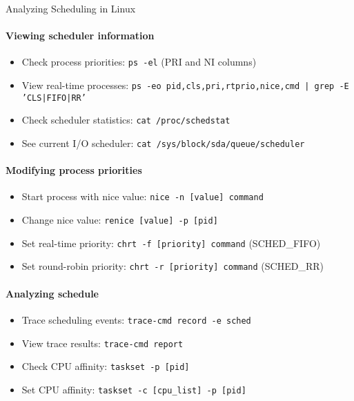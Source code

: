 \begin{KR}{Analyzing Scheduling in Linux}
    \paragraph{Viewing scheduler information}
    \begin{itemize}
        \item Check process priorities: \texttt{ps -el} (PRI and NI columns)
        \item View real-time processes: \texttt{ps -eo pid,cls,pri,rtprio,nice,cmd | grep -E 'CLS|FIFO|RR'}
        \item Check scheduler statistics: \texttt{cat /proc/schedstat}
        \item See current I/O scheduler: \texttt{cat /sys/block/sda/queue/scheduler}
    \end{itemize}
    
    \paragraph{Modifying process priorities}
    \begin{itemize}
        \item Start process with nice value: \texttt{nice -n [value] command}
        \item Change nice value: \texttt{renice [value] -p [pid]}
        \item Set real-time priority: \texttt{chrt -f [priority] command} (SCHED\_FIFO)
        \item Set round-robin priority: \texttt{chrt -r [priority] command} (SCHED\_RR)
    \end{itemize}
    
    \paragraph{Analyzing schedule}
    \begin{itemize}
        \item Trace scheduling events: \texttt{trace-cmd record -e sched}
        \item View trace results: \texttt{trace-cmd report}
        \item Check CPU affinity: \texttt{taskset -p [pid]}
        \item Set CPU affinity: \texttt{taskset -c [cpu\_list] -p [pid]}
    \end{itemize}
\end{KR}

